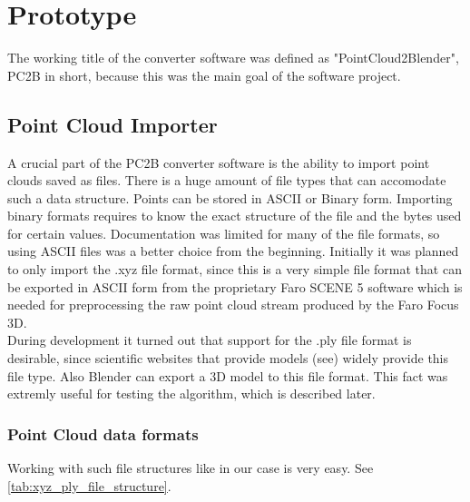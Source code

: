 \section{Prototype}

The working title of the converter software was defined as "PointCloud2Blender", PC2B in short, because this was the main goal of the software project.

\subsection{Point Cloud Importer}

A crucial part of the PC2B converter software is the ability to import point clouds saved as files. There is a huge amount of file types that can accomodate such a data structure. Points can be stored in ASCII or Binary form. Importing binary formats requires to know the exact structure of the file and the bytes used for certain values. Documentation was limited for many of the file formats, so using ASCII files was a better choice from the beginning. Initially it was planned to only import the .xyz file format, since this is a very simple file format that can be exported in ASCII form from the proprietary Faro SCENE 5 software which is needed for preprocessing the raw point cloud stream produced by the Faro Focus 3D.\\
During development it turned out that support for the .ply file format is desirable, since scientific websites that provide models (see) widely provide this file type. Also Blender can export a 3D model to this file format. This fact was extremly useful for testing the algorithm, which is described later.

\subsubsection{Point Cloud data formats}

Working with such file structures like in our case is very easy. See \ref{tab:xyz_ply_file_structure}.


